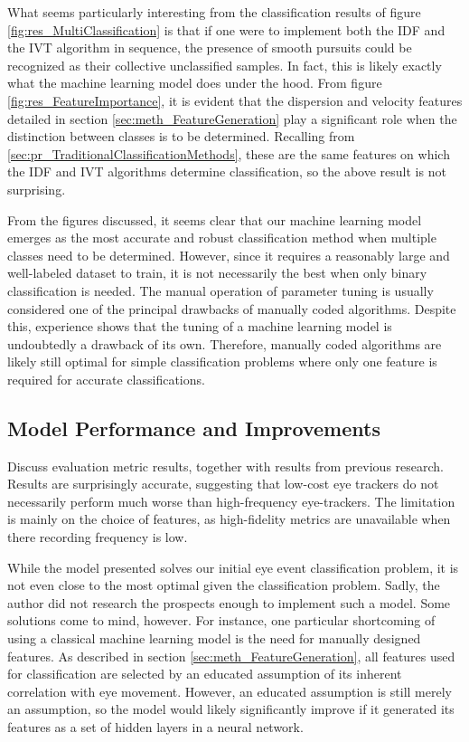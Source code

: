 What seems particularly interesting from the classification results of figure \ref{fig:res_MultiClassification} is that if one were to implement both the IDF and the IVT algorithm in sequence, the presence of smooth pursuits could be recognized as their collective unclassified samples. In fact, this is likely exactly what the machine learning model does under the hood. From figure \ref{fig:res_FeatureImportance}, it is evident that the dispersion and velocity features detailed in section \ref{sec:meth_FeatureGeneration} play a significant role when the distinction between classes is to be determined. Recalling from \ref{sec:pr_TraditionalClassificationMethods}, these are the same features on which the IDF and IVT algorithms determine classification, so the above result is not surprising. 

From the figures discussed, it seems clear that our machine learning model emerges as the most accurate and robust classification method when multiple classes need to be determined. However, since it requires a reasonably large and well-labeled dataset to train, it is not necessarily the best when only binary classification is needed. The manual operation of parameter tuning is usually considered one of the principal drawbacks of manually coded algorithms. Despite this, experience shows that the tuning of a machine learning model is undoubtedly a drawback of its own. Therefore, manually coded algorithms are likely still optimal for simple classification problems where only one feature is required for accurate classifications.

\subsection{Model Performance and Improvements}
Discuss evaluation metric results, together with results from previous research.
Results are surprisingly accurate, suggesting that low-cost eye trackers do not necessarily perform much worse than high-frequency eye-trackers. The limitation is mainly on the choice of features, as high-fidelity metrics are unavailable when there recording frequency is low.

While the model presented solves our initial eye event classification problem, it is not even close to the most optimal given the classification problem. Sadly, the author did not research the prospects enough to implement such a model. Some solutions come to mind, however. For instance, one particular shortcoming of using a classical machine learning model is the need for manually designed features. As described in section \ref{sec:meth_FeatureGeneration}, all features used for classification are selected by an educated assumption of its inherent correlation with eye movement. However, an educated assumption is still merely an assumption, so the model would likely significantly improve if it generated its features as a set of hidden layers in a neural network.

